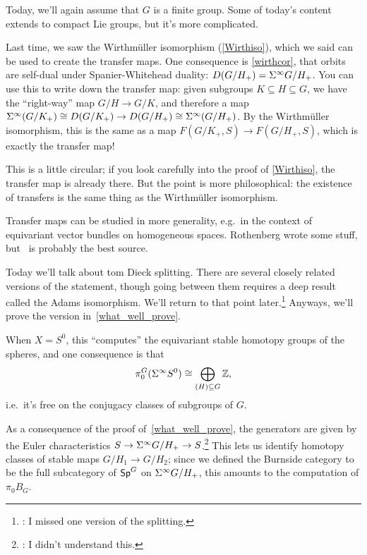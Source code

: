 Today, we'll again assume that $G$ is a finite group. Some of today's content extends to compact Lie groups, but
it's more complicated.

Last time, we saw the Wirthmüller isomorphism (\cref{Wirthiso}), which we said can be used to create the
transfer maps. One consequence is \cref{wirthcor}, that orbits are self-dual under Spanier-Whitehead duality:
$D(G/H_+) = \Sigma^\infty G/H_+$. You can use this to write down the transfer map: given subgroups $K\subseteq
H\subseteq G$, we have the ``right-way'' map $G/H\to G/K$, and therefore a map $\Sigma^\infty(G/K_+)\cong
D(G/K_+)\to D(G/H_+)\cong\Sigma^\infty(G/H_+)$. By the Wirthmüller isomorphism, this is the same as a map
$F(G/K_+,S)\to F(G/H_+,S)$, which is exactly the transfer map!

This is a little circular; if you look carefully into the proof of \cref{Wirthiso}, the transfer map is already
there. But the point is more philosophical: the existence of transfers is the same thing as the Wirthmüller
isomorphism.
\begin{rem}
Transfer maps can be studied in more generality, e.g.\ in the context of equivariant vector bundles on homogeneous
spaces. Rothenberg wrote some stuff, but~\cite{LMS} is probably the best source.
\end{rem}
Today we'll talk about tom Dieck splitting. There are several closely related versions of the statement, though
going between them requires a deep result called the Adams isomorphism. We'll return to that point
later.\footnote{\TODO: I missed one version of the splitting.}
Anyways, we'll prove the version in~\eqref{what_well_prove}.

When $X = S^0$, this ``computes'' the equivariant stable homotopy groups of the spheres, and one consequence is
that
\[\pi^G_0(\Sigma^\infty S^0) \cong \bigoplus_{(H)\subseteq G} \mathbb Z,\]
i.e.\ it's free on the conjugacy classes of subgroups of $G$.

As a consequence of the proof of~\eqref{what_well_prove}, the generators are given by the Euler characteristics
$S\to \Sigma^\infty G/H_+\to S$.\footnote{\TODO: I didn't understand this.} This lets us identify homotopy classes
of stable maps $G/H_1\to G/H_2$; since we defined the Burnside category to be the full subcategory of $\mathsf{Sp}^G$ on
$\Sigma^\infty G/H_+$, this amounts to the computation of $\pi_0 B_G$.

